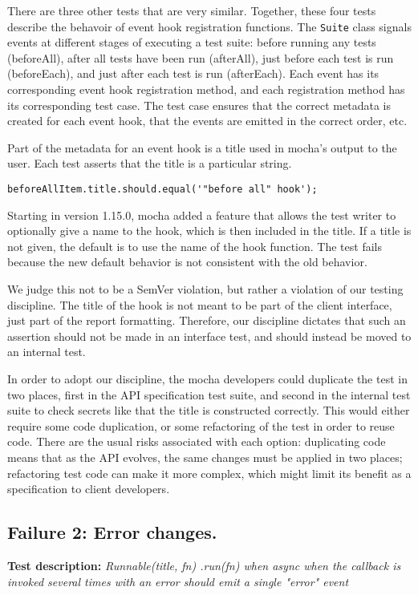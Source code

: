 There are three other tests that are very similar. Together, these
four tests describe the behavoir of event hook registration
functions. The {\tt Suite} class signals events at different stages of
executing a test suite: before running any tests (beforeAll), after
all tests have been run (afterAll), just before each test is run
(beforeEach), and just after each test is run (afterEach). Each event
has its corresponding event hook registration method, and each
registration method has its corresponding test case. The test case
ensures that the correct metadata is created for each event hook, that
the events are emitted in the correct order, etc.

Part of the metadata for an event hook is a title used in mocha's
output to the user. Each test asserts that the title is a particular
string.

{\small
\begin{verbatim}
beforeAllItem.title.should.equal('"before all" hook');
\end{verbatim}
}

Starting in version 1.15.0, mocha added a feature that allows the test
writer to optionally give a name to the hook, which is then included
in the title. If a title is not given, the default is to use the name
of the hook function. The test fails because the new default behavior
is not consistent with the old behavior.

We judge this not to be a SemVer violation, but rather a violation of
our testing discipline. The title of the hook is not meant to be part
of the client interface, just part of the report
formatting. Therefore, our discipline dictates that such an assertion
should not be made in an interface test, and should instead be moved
to an internal test.

In order to adopt our discipline, the mocha developers could duplicate
the test in two places, first in the API specification test suite, and
second in the internal test suite to check secrets like that the title
is constructed correctly. This would either require some code
duplication, or some refactoring of the test in order to reuse
code. There are the usual risks associated with each option:
duplicating code means that as the API evolves, the same changes must
be applied in two places; refactoring test code can make it more
complex, which might limit its benefit as a specification to client
developers.

\subsection{Failure 2: Error changes.}
{\bf Test description: }
%
{\em Runnable(title, fn) .run(fn) when async when the callback is
  invoked several times with an error should emit a single "error"
  event }

